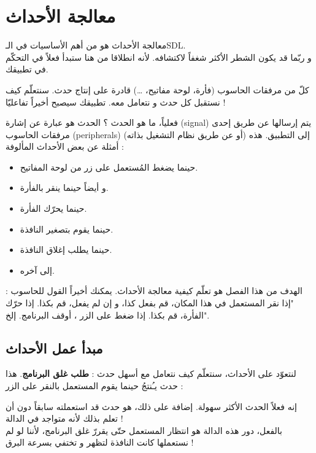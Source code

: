 \chapter{معالجة الأحداث}

معالجة الأحداث هو من أهم الأساسيات في الـ\textenglish{SDL}.\\
و ربّما قد يكون الشطر الأكثر شغفاً لاكتشافه. لأنه انطلاقا من هنا ستبدأ فعلاً في التحكّم في تطبيقك.

كلّ من مرفقات الحاسوب (فأرة، لوحة مفاتيح، \dots) قادرة على إنتاج حدث. سنتعلّم كيف نستقبل كل حدث و نتعامل معه. تطبيقك سيصبح أخيراً تفاعليّا !

فعلياً، ما هو الحدث ؟ الحدث هو عبارة عن إشارة
(\textenglish{signal})
يتم إرسالها عن طريق إحدى مرفقات الحاسوب 
(\textenglish{peripherals})
(أو عن طريق نظام التشغيل بذاته) إلى التطبيق. هذه أمثلة عن بعض الأحداث المألوفة :

\begin{itemize}
	\item حينما يضغط المُستعمل على زر من لوحة المفاتيح.
	\item و أيضاً حينما ينقر بالفأرة.
	\item حينما يحرّك الفأرة.
	\item حينما يقوم بتصغير النافذة.
	\item حينما يطلب إغلاق النافذة.
	\item إلى آخره.
\end{itemize}

الهدف من هذا الفصل هو تعلّم كيفية معالجة الأحداث. يمكنك أخيراً القول للحاسوب : "إذا نقر المستعمل في هذا المكان، قم بفعل كذا، و إن لم يفعل، قم بكذا. إذا حرّك الفأرة، قم بكذا. إذا ضغط على الزر
،
أوقف البرنامج. إلخ".

\section{مبدأ عمل الأحداث}

لنتعوّد على الأحداث، سنتعلّم كيف نتعامل مع أسهل حدث :
\textbf{طلب غلق البرنامج}.
هذا حدث يـُنتجُ حينما يقوم المستعمل بالنقر على الزر
 :


إنه فعلاً الحدث الأكثر سهولة. إضافة على ذلك، هو حدث قد استعملته سابقاً دون أن تعلم بذلك لأنه متواجد في الدالة 
 !\\
بالفعل، دور هذه الدالة هو انتظار المستعمل حتّى يقررّ غلق البرنامج، لأننا لو لم نستعملها كانت النافذة لتظهر و تختفي بسرعة البرق !

